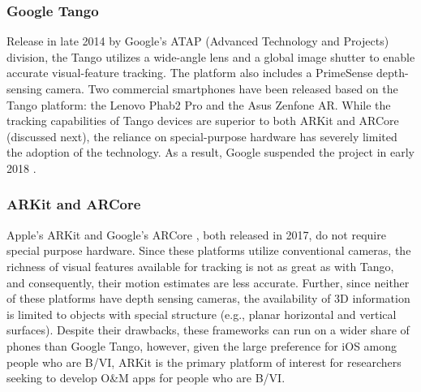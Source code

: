 \documentclass[chi_draft]{sigchi}
\newcommand{\BVI}{B/VI\xspace}
\newcommand{\OM}{O\&M\xspace}
\begin{document}
\subsubsection{Google Tango}
Release in late 2014 by Google's ATAP (Advanced Technology and Projects) division, the Tango utilizes a wide-angle lens and a global image shutter to enable accurate visual-feature tracking.  The platform also includes a PrimeSense depth-sensing camera.  Two commercial smartphones have been released based on the Tango platform: the Lenovo Phab2 Pro and the Asus Zenfone AR.  While the tracking capabilities of Tango devices are superior to both ARKit and ARCore (discussed next), the reliance on special-purpose hardware has severely limited the adoption of the technology.  As a result, Google suspended the project in early 2018 \cite{tangoretired}.


\subsubsection{ARKit and ARCore}

Apple's ARKit \cite{arkit} and Google's ARCore \cite{arcore}, both released in 2017, do not require special purpose hardware.  Since these platforms utilize conventional cameras, the richness of visual features available for tracking is not as great as with Tango, and consequently, their motion estimates are less accurate.  Further, since neither of these platforms have depth sensing cameras, the availability of 3D information is limited to objects with special structure (e.g., planar horizontal and vertical surfaces).  Despite their drawbacks, these frameworks can run on a wider share of phones than Google Tango, however, given the large preference for iOS among people who are \BVI \cite{morris2014blind}, ARKit is the primary platform of interest for researchers seeking to develop \OM apps for people who are \BVI.

\end{document}
